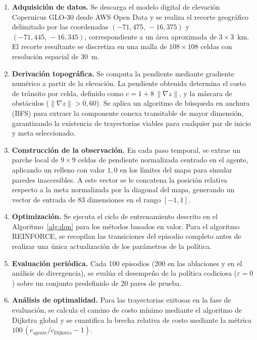 \begin{enumerate}
  \item \textbf{Adquisición de datos.} Se descarga el modelo digital de elevación Copernicus GLO-30 desde AWS Open Data y se realiza el recorte geográfico delimitado por las coordenadas $(-71{,}475,\,-16{,}375)$ y $(-71{,}445,\,-16{,}345)$, correspondiente a un área aproximada de $3\times3$~km. El recorte resultante se discretiza en una malla de $108\times108$ celdas con resolución espacial de 30~m.
  \item \textbf{Derivación topográfica.} Se computa la pendiente mediante gradiente numérico a partir de la elevación. La pendiente obtenida determina el costo de tránsito por celda, definido como $c = 1 + 8\,\lVert\nabla z\rVert$, y la máscara de obstáculos ($\lVert\nabla z\rVert > 0{,}60$). Se aplica un algoritmo de búsqueda en anchura (BFS) para extraer la componente conexa transitable de mayor dimensión, garantizando la existencia de trayectorias viables para cualquier par de inicio y meta seleccionado.
  \item \textbf{Construcción de la observación.} En cada paso temporal, se extrae un parche local de $9\times9$ celdas de pendiente normalizada centrado en el agente, aplicando un relleno con valor $1{,}0$ en los límites del mapa para simular paredes inaccesibles. A este vector se le concatena la posición relativa respecto a la meta normalizada por la diagonal del mapa, generando un vector de entrada de 83 dimensiones en el rango $[-1,1]$.
  \item \textbf{Optimización.} Se ejecuta el ciclo de entrenamiento descrito en el Algoritmo~\ref{alg:dqn} para los métodos basados en valor. Para el algoritmo REINFORCE, se recopilan las transiciones del episodio completo antes de realizar una única actualización de los parámetros de la política.
  \item \textbf{Evaluación periódica.} Cada 100 episodios (200 en las ablaciones y en el análisis de divergencia), se evalúa el desempeño de la política codiciosa ($\varepsilon=0$) sobre un conjunto predefinido de 20 pares de prueba.
  \item \textbf{Análisis de optimalidad.} Para las trayectorias exitosas en la fase de evaluación, se calcula el camino de costo mínimo mediante el algoritmo de Dijkstra global y se cuantifica la brecha relativa de costo mediante la métrica $100\,(c_{\text{agente}}/c_{\text{Dijkstra}}-1)$.
\end{enumerate}

